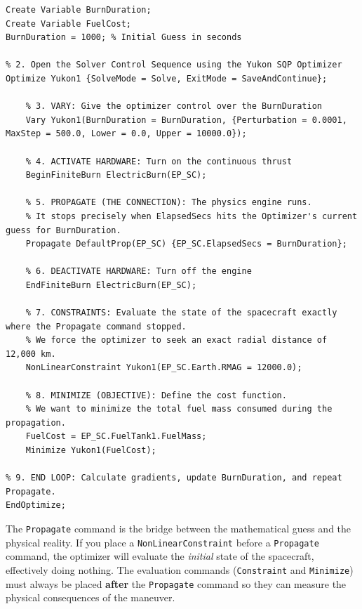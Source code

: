 \documentclass[11pt, letterpaper]{article}
\begin{document}
\begin{lstlisting}[caption=GMAT Script: Connecting Optimize to Propagate]
% 1. Create a variable for the optimizer to manipulate
Create Variable BurnDuration;
Create Variable FuelCost;
BurnDuration = 1000; % Initial Guess in seconds

% 2. Open the Solver Control Sequence using the Yukon SQP Optimizer
Optimize Yukon1 {SolveMode = Solve, ExitMode = SaveAndContinue};

    % 3. VARY: Give the optimizer control over the BurnDuration
    Vary Yukon1(BurnDuration = BurnDuration, {Perturbation = 0.0001, MaxStep = 500.0, Lower = 0.0, Upper = 10000.0});
    
    % 4. ACTIVATE HARDWARE: Turn on the continuous thrust
    BeginFiniteBurn ElectricBurn(EP_SC);
    
    % 5. PROPAGATE (THE CONNECTION): The physics engine runs. 
    % It stops precisely when ElapsedSecs hits the Optimizer's current guess for BurnDuration.
    Propagate DefaultProp(EP_SC) {EP_SC.ElapsedSecs = BurnDuration};
    
    % 6. DEACTIVATE HARDWARE: Turn off the engine
    EndFiniteBurn ElectricBurn(EP_SC);
    
    % 7. CONSTRAINTS: Evaluate the state of the spacecraft exactly where the Propagate command stopped.
    % We force the optimizer to seek an exact radial distance of 12,000 km.
    NonLinearConstraint Yukon1(EP_SC.Earth.RMAG = 12000.0);
    
    % 8. MINIMIZE (OBJECTIVE): Define the cost function. 
    % We want to minimize the total fuel mass consumed during the propagation.
    FuelCost = EP_SC.FuelTank1.FuelMass;
    Minimize Yukon1(FuelCost);

% 9. END LOOP: Calculate gradients, update BurnDuration, and repeat Propagate.
EndOptimize;
\end{lstlisting}

\begin{tcolorbox}[colback=blue!5!white,colframe=blue!75!black,title=Key Takeaway for Students]
The \texttt{Propagate} command is the bridge between the mathematical guess and the physical reality. If you place a \texttt{NonLinearConstraint} before a \texttt{Propagate} command, the optimizer will evaluate the \textit{initial} state of the spacecraft, effectively doing nothing. The evaluation commands (\texttt{Constraint} and \texttt{Minimize}) must always be placed \textbf{after} the \texttt{Propagate} command so they can measure the physical consequences of the maneuver.
\end{tcolorbox}
\end{document}
